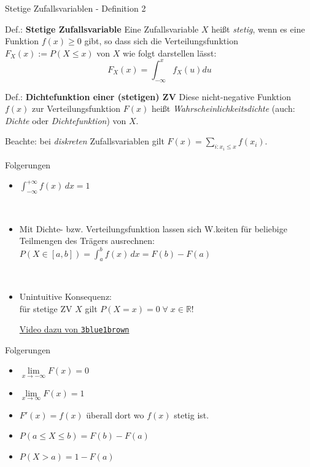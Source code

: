 \documentclass[
  10pt,
  ignorenonframetext,
]{beamer}
\begin{document}
\begin{frame}{Stetige Zufallsvariablen - Definition 2}
\label{stetige-zufallsvariablen---definition-2}
\begin{block}{Def.: \textbf{Stetige Zufallsvariable}}
\label{def.-stetige-zufallsvariable-1}
Eine Zufallsvariable \(X\) heißt \emph{stetig}, wenn es eine Funktion
\(f(x) \geq 0\) gibt, so dass sich die Verteilungsfunktion
\(F_X(x) := P(X \leq x)\) von \(X\) wie folgt darstellen lässt:
\[F_X(x) = \int_{-\infty}^x f_X(u) du\]
\end{block}

\begin{block}{Def.: \textbf{Dichtefunktion einer (stetigen) ZV}}
\label{def.-dichtefunktion-einer-stetigen-zv}
Diese nicht-negative Funktion \(f(x)\) zur Verteilungsfunktion \(F(x)\)
heißt \emph{Wahrscheinlichkeitsdichte} (auch: \emph{Dichte} oder
\emph{Dichtefunktion}) von \(X\).
\end{block}

\hfill\break

Beachte: bei \emph{diskreten} Zufallsvariablen gilt
\(F(x) = \sum_{i: x_i \leq x} f(x_i)\).
\end{frame}

\begin{frame}[fragile]{Folgerungen}
\label{folgerungen-2}
\begin{itemize}
\item
  \(\int_{-\infty}^{+\infty} f(x)\,dx = 1\)\\
  \strut ~
\item
  Mit Dichte- bzw. Verteilungsfunktion lassen sich W.keiten für
  beliebige Teilmengen des Trägers ausrechnen:\\
  \(P(X \in [a, b])  =  \int_a^b f(x)\,dx = F(b) - F(a)\)\\
  \strut ~
\item
  Unintuitive Konsequenz:\\
  für stetige ZV \(X\) gilt
  \(P(X = x) = 0 \; \forall \; x \in \mathbb{R}\)!

  \scriptsize \href{https://youtu.be/ZA4JkHKZM50}{Video dazu von
  \texttt{3blue1brown}}
\end{itemize}
\end{frame}

\begin{frame}{Folgerungen}
\label{folgerungen-3}
\begin{itemize}
\item
  \(\lim\limits_{x \to -\infty} F(x) = 0\)
\item
  \(\lim\limits_{x \to \infty} F(x) = 1\)
\item
  \(F'(x) = f(x)\) überall dort wo \(f(x)\) stetig ist.
\item
  \(P(a \leq X \leq b) = F(b) - F(a)\)
\item
  \(P(X > a) = 1 - F(a)\)
\end{itemize}
\end{frame}
\end{document}
